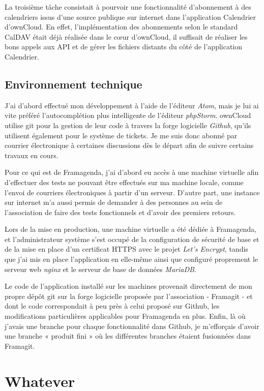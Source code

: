 \documentclass[10pt,a4paper]{report}
\begin{document}
	La troisième tâche consistait à pourvoir une fonctionnalité d'abonnement à des calendriers issus d'une source publique sur internet dans l'application Calendrier d'ownCloud. En effet, l'implémentation des abonnements selon le standard CalDAV était déjà réalisée dans le cœur d'ownCloud, il suffisait de réaliser les bons appels aux API et de gérer les fichiers distants du côté de l'application Calendrier.
	
	\section{Environnement technique}
	J'ai d'abord effectué mon développement à l'aide de l'éditeur \textit{Atom}, mais je lui ai vite préféré l'autocomplétion plus intelligente de l'éditeur \textit{phpStorm}. ownCloud utilise git pour la gestion de leur code à travers la forge logicielle \textit{Github}, qu'ils utilisent également pour le système de tickets. Je me suis donc abonné par courrier électronique à certaines discussions dès le départ afin de suivre certains travaux en cours.
	
	Pour ce qui est de Framagenda, j'ai d'abord eu accès à une machine virtuelle afin d'effectuer des tests ne pouvant être effectués sur ma machine locale, comme l'envoi de courriers électroniques à partir d'un serveur. D'autre part, une instance sur internet m'a aussi permis de demander à des personnes au sein de l'association de faire des tests fonctionnels et d'avoir des premiers retours.
	
	Lors de la mise en production, une machine virtuelle a été dédiée à Framagenda, et l'administrateur système s'est occupé de la configuration de sécurité de base et de la mise en place d'un certificat \textsc{HTTPS} avec le projet \textit{Let's Encrypt}, tandis que j'ai mis en place l'application en elle-même ainsi que configuré proprement le serveur web \textit{nginx} et le serveur de base de données \textit{MariaDB}.
	
	Le code de l'application installé sur les machines provenait directement de mon propre dépôt git sur la forge logicielle proposée par l'association - Framagit - et dont le code correspondait à peu près à celui proposé sur Github, les modifications particulières applicables pour Framagenda en plus. Enfin, là où j'avais une branche pour chaque fonctionnalité dans Github, je m'efforçais d'avoir une branche « produit fini » où les différentes branches étaient fusionnées dans Framagit.
	
	\chapter{Whatever}
\end{document}
